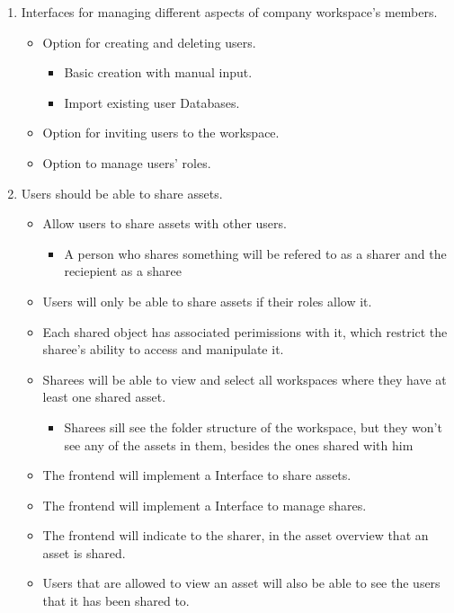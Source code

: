 \begin{enumerate}
    \item Interfaces for managing different aspects of company workspace's members.
    \begin{itemize}
        \item Option for creating and deleting users.
        \begin{itemize}
            \item Basic creation with manual input.
            \item Import existing user Databases.
        \end{itemize}
        \item Option for inviting users to the workspace.
        \item Option to manage users' roles.
    \end{itemize}
    
    \item Users should be able to share assets.
    \begin{itemize}
        \item Allow users to share assets with other users.
        \begin{itemize}
            \item A person who shares something will be refered to as a sharer and the reciepient as a sharee
        \end{itemize}
        \item Users will only be able to share assets if their roles allow it.
        \item Each shared object has associated perimissions with it, which restrict the sharee's ability to access and manipulate it.
        \item Sharees will be able to view and select all workspaces where they have at least one shared asset.
        \begin{itemize}
            \item Sharees sill see the folder structure of the workspace, but they won't see any of the assets in them, besides the ones shared with him
        \end{itemize}
        \item The frontend will implement a Interface to share assets.
        \item The frontend will implement a Interface to manage shares.
        \item The frontend will indicate to the sharer, in the asset overview that an asset is shared.
        \item Users that are allowed to view an asset will also be able to see the users that it has been shared to.
    \end{itemize}
\end{enumerate}